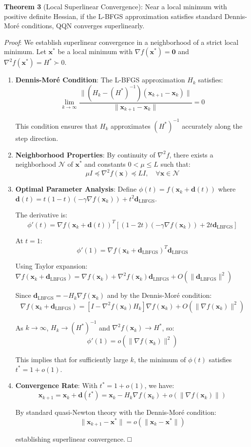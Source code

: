 \textbf{Theorem 3} (Local Superlinear Convergence): Near a local minimum with positive definite Hessian, if the L-BFGS approximation satisfies standard Dennis-Moré conditions, QQN converges superlinearly.

\emph{Proof}: We establish superlinear convergence in a neighborhood of a strict local minimum. Let \(\mathbf{x}^*\) be a local minimum with \(\nabla f(\mathbf{x}^*) = \mathbf{0}\) and \(\nabla^2 f(\mathbf{x}^*) = H^* \succ 0\).

\begin{enumerate}
\def\labelenumi{\arabic{enumi}.}
\item
  \textbf{Dennis-Moré Condition}: The L-BFGS approximation \(H_k\) satisfies:
  \[\lim_{k \to \infty} \frac{\|(H_k - (H^*)^{-1})(\mathbf{x}_{k+1} - \mathbf{x}_k)\|}{\|\mathbf{x}_{k+1} - \mathbf{x}_k\|} = 0\]

  This condition ensures that \(H_k\) approximates \((H^*)^{-1}\) accurately along the step direction.
\item
  \textbf{Neighborhood Properties}: By continuity of \(\nabla^2 f\), there exists a neighborhood \(\mathcal{N}\) of \(\mathbf{x}^*\) and constants \(0 < \mu \leq L\) such that:
  \[\mu I \preceq \nabla^2 f(\mathbf{x}) \preceq L I, \quad \forall \mathbf{x} \in \mathcal{N}\]
\item
  \textbf{Optimal Parameter Analysis}: Define \(\phi(t) = f(\mathbf{x}_k + \mathbf{d}(t))\) where \(\mathbf{d}(t) = t(1-t)(-\gamma\nabla f(\mathbf{x}_k)) + t^2\mathbf{d}_{\text{LBFGS}}\).

  The derivative is:
  \[\phi'(t) = \nabla f(\mathbf{x}_k + \mathbf{d}(t))^T[(1-2t)(-\gamma\nabla f(\mathbf{x}_k)) + 2t\mathbf{d}_{\text{LBFGS}}]\]

  At \(t = 1\):
  \[\phi'(1) = \nabla f(\mathbf{x}_k + \mathbf{d}_{\text{LBFGS}})^T \mathbf{d}_{\text{LBFGS}}\]

  Using Taylor expansion: \(\nabla f(\mathbf{x}_k + \mathbf{d}_{\text{LBFGS}}) = \nabla f(\mathbf{x}_k) + \nabla^2 f(\mathbf{x}_k)\mathbf{d}_{\text{LBFGS}} + O(\|\mathbf{d}_{\text{LBFGS}}\|^2)\)

  Since \(\mathbf{d}_{\text{LBFGS}} = -H_k\nabla f(\mathbf{x}_k)\) and by the Dennis-Moré condition:
  \[\nabla f(\mathbf{x}_k + \mathbf{d}_{\text{LBFGS}}) = [I - \nabla^2 f(\mathbf{x}_k)H_k]\nabla f(\mathbf{x}_k) + O(\|\nabla f(\mathbf{x}_k)\|^2)\]

  As \(k \to \infty\), \(H_k \to (H^*)^{-1}\) and \(\nabla^2 f(\mathbf{x}_k) \to H^*\), so:
  \[\phi'(1) = o(\|\nabla f(\mathbf{x}_k)\|^2)\]

  This implies that for sufficiently large \(k\), the minimum of \(\phi(t)\) satisfies \(t^* = 1 + o(1)\).
\item
  \textbf{Convergence Rate}: With \(t^* = 1 + o(1)\), we have:
  \[\mathbf{x}_{k+1} = \mathbf{x}_k + \mathbf{d}(t^*) = \mathbf{x}_k - H_k\nabla f(\mathbf{x}_k) + o(\|\nabla f(\mathbf{x}_k)\|)\]

  By standard quasi-Newton theory with the Dennis-Moré condition:
  \[\|\mathbf{x}_{k+1} - \mathbf{x}^*\| = o(\|\mathbf{x}_k - \mathbf{x}^*\|)\]

  establishing superlinear convergence. □
\end{enumerate}

